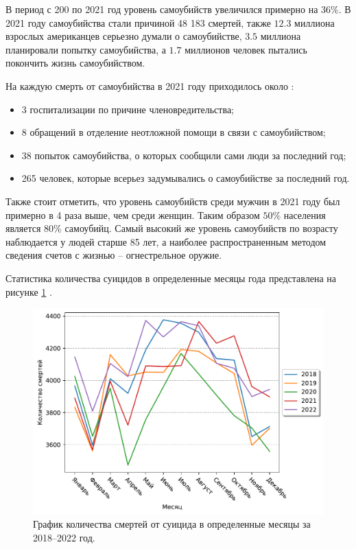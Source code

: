 В период с 200 по 2021 год уровень самоубийств увеличился примерно на $36\%$. В 2021 году самоубийства стали причиной 48 183 смертей, также $12.3$ миллиона взрослых американцев серьезно думали о самоубийстве, $3.5$ миллиона планировали попытку самоубийства, а $1.7$ миллионов человек пытались покончить жизнь самоубийством. \cite{suicideStats}

На каждую смерть от самоубийства в 2021 году приходилось около \cite{suicideStats}:
\begin{itemize}
	\item 3 госпитализации по причине членовредительства;
	\item 8 обращений в отделение неотложной помощи в связи с самоубийством;
	\item 38 попыток самоубийства, о которых сообщили сами люди за последний год;
	\item 265 человек, которые всерьез задумывались о самоубийстве за последний год. 
\end{itemize}

Также стоит отметить, что уровень самоубийств среди мужчин в 2021 году был примерно в 4 раза выше, чем среди женщин. Таким образом $50\%$ населения является $80\%$ самоубийц. Самый высокий же уровень самоубийств по возрасту наблюдается у людей старше 85 лет, а наиболее распространенным методом сведения счетов с жизнью -- огнестрельное оружие.

Статистика количества суицидов в определенные месяцы года представлена на рисунке \ref{img:cdcsuicides} \cite{suicideStats}.

\begin{figure}[H]
	\centering
	\includegraphics[width=\textwidth]{inc/deathToMonth.pdf}
	\caption{ График количества смертей от суицида в определенные месяцы за 2018--2022 год. }
	\label{img:cdcsuicides}
\end{figure}


